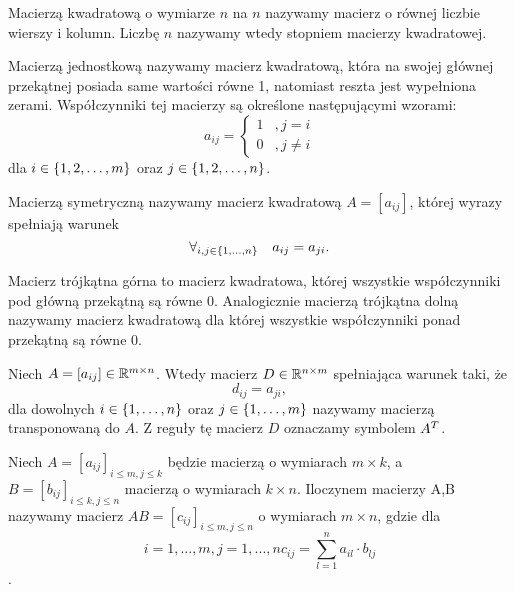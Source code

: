 \documentclass[10pt,a4paper]{report}
\begin{document}
\begin{definition} \label{definicja-macierzy}
Macierzą kwadratową o wymiarze $n$ na $n$ nazywamy macierz o równej liczbie wierszy i kolumn. Liczbę $n$ nazywamy wtedy stopniem macierzy kwadratowej.
\end{definition}

\begin{definition}
Macierzą jednostkową nazywamy macierz kwadratową, która na swojej głównej przekątnej posiada same wartości równe 1, natomiast reszta jest wypełniona zerami. Współczynniki tej macierzy są określone następującymi wzorami: 
$$
a_{ij} = \left\{ \begin{array}{ll}
1 &, j=i\\
0 &, j\ne i
\end{array} \right.
$$
dla $i \in \left\lbrace {1,2,\ldots,m} \right\rbrace $ oraz $j \in \left\lbrace {1,2,\ldots, n} \right\rbrace$.
\end{definition}

\begin{definition}
Macierzą symetryczną nazywamy macierz kwadratową $A=[a_{ij}]$, której wyrazy spełniają warunek 
$$
\forall_{i,j \in \left\lbrace {1,\ldots,n} \right\rbrace} \quad a_{ij}=a_{ji}.
$$
\end{definition}

\begin{definition}
Macierz trójkątna górna to macierz kwadratowa, której wszystkie współczynniki pod główną przekątną są równe $0$. Analogicznie macierzą trójkątna dolną nazywamy macierz kwadratową dla której wszystkie współczynniki ponad przekątną są równe $0$.
\end{definition}

\begin{definition}
Niech $A=[a_{ij}] \in \mathbb{R}^{m \times n}$. Wtedy macierz $D \in \mathbb{R}^{n \times m}$ spełniająca warunek taki, że
$$
d_{ij} = a_{ji},
$$
dla dowolnych $i \in \left\lbrace {1,\ldots, n} \right\rbrace$ oraz $j \in \left\lbrace {1,\ldots,m} \right\rbrace$ nazywamy macierzą transponowaną do $A$. Z reguły tę macierz $D$ oznaczamy symbolem ${A}^T$.
\end{definition}


\begin{definition}
Niech $A=[a_{ij}]_{i\le m, j\le k}$ będzie macierzą o wymiarach $m\times k$, a $B=[b_{ij}]_{i\le k, j\le n}$ macierzą o wymiarach $k\times n$. Iloczynem macierzy A,B nazywamy macierz $AB=[c_{ij}]_{i\le m, j\le n}$ o wymiarach $m\times n$, gdzie dla $$i=1,...,m, j=1,...,n c_{ij}= \sum_{l=1}^{n} a_{il} \cdot b_{lj}$$.
\end{definition}
\end{document}
